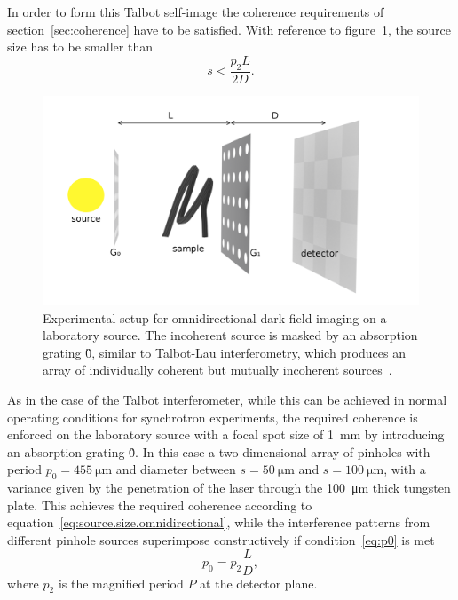In order to form this Talbot self-image the coherence requirements of
section~\ref{sec:coherence} have to be satisfied. With reference to
figure~\ref{fig:omnidirectional-lab}, the source size has to be
smaller than
\begin{equation}
    s < \frac{p_2L}{2D}.
    \label{eq:source.size.omnidirectional}
\end{equation}

\begin{figure}[htb]
    \centering
    \includegraphics[width=\textwidth]{gfx/omnidirectional/schematic-with-arrows.png}
    \caption[Experimental setup for omnidirectional interferometry on a
    laboratory source.]{Experimental setup for omnidirectional dark-field imaging on a
    laboratory source. The incoherent source is masked by an absorption
grating \G0, similar to Talbot-Lau interferometry, which produces an array
of individually coherent but mutually incoherent
sources~\parencite{kagias2018omnidir}.}
    \label{fig:omnidirectional-lab}
\end{figure}

As in the case of the Talbot interferometer, while this can be achieved in
normal operating conditions for synchrotron experiments, the required
coherence is enforced on the laboratory source with a focal spot size of
\SI{1}{\milli\meter} by introducing an absorption grating \G0. In this case
a two-dimensional array of pinholes with period $p_0 =
\SI{455}{\micro\meter}$ and diameter between $s = \SI{50}{\micro\meter}$ and
$ s = \SI{100}{\micro\meter}$, with a variance given by the penetration of
the laser through the \SI{100}{\micro\meter} thick tungsten
plate. This achieves the required coherence according to
equation~\eqref{eq:source.size.omnidirectional}, while the interference
patterns from different pinhole sources superimpose constructively if
condition~\eqref{eq:p0} is met
\begin{equation}
    p_0 = p_2 \frac{L}{D}\label{eq:p0.omnidirectional},
\end{equation}
where $p_2$ is the magnified period $P$ at the detector plane.

